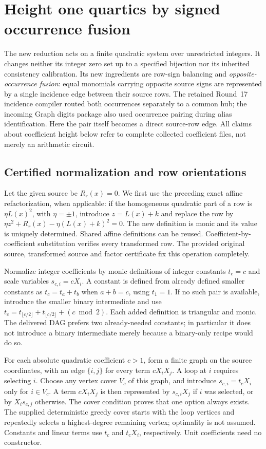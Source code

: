\section{Height one quartics by signed occurrence fusion}
\label{sec:signed-network}
The new reduction acts on a finite quadratic system over unrestricted
integers. It changes neither its integer zero set up to a specified
bijection nor its inherited consistency calibration. Its new ingredients
are row-sign balancing and \emph{opposite-occurrence fusion}: equal
monomials carrying opposite source signs are represented by a single
incidence edge between their source rows. The retained Round~17 incidence compiler routed
both occurrences separately to a common hub; the incoming Graph digits
package also used occurrence pairing during alias identification. Here the
pair itself becomes a direct source-row edge. All claims about coefficient
height below refer to complete collected coefficient files, not merely an
arithmetic circuit.

\subsection{Certified normalization and row orientations}
Let the given source be $R_r(x)=0$. We first use the preceding exact affine
refactorization, when applicable: if the homogeneous quadratic part of a
row is $\eta L(x)^2$, with $\eta=\pm1$, introduce $z=L(x)+k$ and replace
the row by $\eta z^2+R_r(x)-\eta(L(x)+k)^2=0$. The new definition is monic
and its value is uniquely determined. Shared affine definitions can be
reused. Coefficient-by-coefficient substitution verifies every transformed
row. The provided original source, transformed source and factor
certificate fix this operation completely.

Normalize integer coefficients by monic definitions of integer constants
$t_c=c$ and scale variables $s_{c,i}=cX_i$. A constant is defined from
already defined smaller constants as $t_c=t_a+t_b$ when $a+b=c$, using
$t_1=1$. If no such pair is available, introduce the smaller binary
intermediate and use
$t_c=t_{\lfloor c/2\rfloor}+t_{\lfloor c/2\rfloor}+(c\bmod2)$.
Each added definition is triangular and monic. The delivered DAG prefers
two already-needed constants; in particular it does not introduce a
binary intermediate merely because a binary-only recipe would do so.

For each absolute quadratic coefficient $c>1$, form a finite graph on the
source coordinates, with an edge $\{i,j\}$ for every term $cX_iX_j$.
A loop at $i$ requires selecting $i$. Choose any vertex cover $V_c$ of
this graph, and introduce $s_{c,i}=t_cX_i$ only for $i\in V_c$. A term
$cX_iX_j$ is then represented by $s_{c,i}X_j$ if $i$ was selected, or by
$X_is_{c,j}$ otherwise. The cover condition proves that one option always
exists. The supplied deterministic greedy cover starts with the loop
vertices and repeatedly selects a highest-degree remaining vertex;
optimality is not assumed. Constants and linear terms use $t_c$ and
$t_cX_i$, respectively. Unit coefficients need no constructor.


